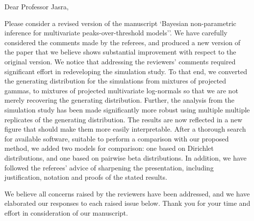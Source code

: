 \documentclass[10pt]{article}
\begin{document}
Dear Professor Jasra,

\vskip 1.5cm

Please consider a revised version of the manuscript `Bayesian non-parametric inference for 
multivariate peaks-over-threshold models''. We have carefully considered the comments made
by the referees, and produced a new version of the paper that we believe shows substantial
improvement with respect to the original version. We notice that addressing the reviewers' 
comments required significant
    effort in redeveloping the simulation study.  To that end, we converted the generating distribution
    for the simulations from mixtures of projected gammas, to mixtures of projected multivariate 
    log-normals so that we are not merely recovering the generating distribution.  Further, the analysis 
    from the simulation study has been made significantly more robust using multiple 
    multiple replicates of the generating distribution.  The results are now reflected in a new figure
    that should make them more easily interpretable.  After a thorough search for available software,
    suitable to perform a comparison with our proposed method, we added two models for 
    comparison: one based on Dirichlet distributions, and one based on pairwise beta distributions.  In
    addition, we have followed the referees' advice of sharpening the presentation, including
    justification, notation and proofs of the stated results.

We believe all concerns raised by the reviewers have been addressed, and we have elaborated our responses
    to each raised issue below.  Thank you for your time and effort in consideration of our manuscript.





    
\end{document}
